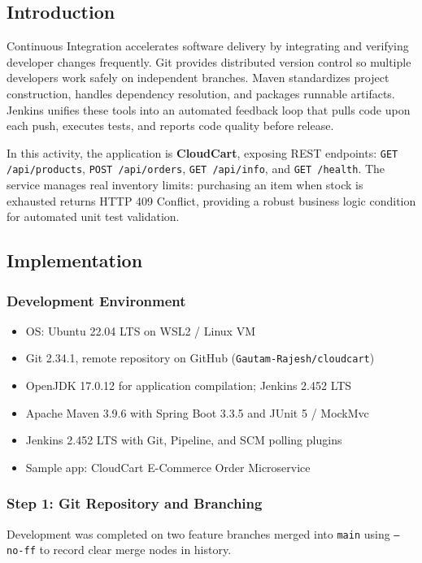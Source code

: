 \documentclass[12pt,a4paper]{article}
\begin{document}
\subsection*{Introduction}
Continuous Integration accelerates software delivery by integrating and verifying developer changes frequently. Git provides distributed version control so multiple developers work safely on independent branches. Maven standardizes project construction, handles dependency resolution, and packages runnable artifacts. Jenkins unifies these tools into an automated feedback loop that pulls code upon each push, executes tests, and reports code quality before release.

In this activity, the application is \textbf{CloudCart}, exposing REST endpoints: \texttt{GET /api/products}, \texttt{POST /api/orders}, \texttt{GET /api/info}, and \texttt{GET /health}. The service manages real inventory limits: purchasing an item when stock is exhausted returns HTTP 409 Conflict, providing a robust business logic condition for automated unit test validation.

\subsection*{Implementation}

\subsubsection*{Development Environment}
\begin{itemize}[nosep]
    \item OS: Ubuntu 22.04 LTS on WSL2 / Linux VM
    \item Git 2.34.1, remote repository on GitHub (\texttt{Gautam-Rajesh/cloudcart})
    \item OpenJDK 17.0.12 for application compilation; Jenkins 2.452 LTS
    \item Apache Maven 3.9.6 with Spring Boot 3.3.5 and JUnit 5 / MockMvc
    \item Jenkins 2.452 LTS with Git, Pipeline, and SCM polling plugins
    \item Sample app: CloudCart E-Commerce Order Microservice
\end{itemize}

\subsubsection*{Step 1: Git Repository and Branching}
Development was completed on two feature branches merged into \texttt{main} using \texttt{--no-ff} to record clear merge nodes in history.
\end{document}
